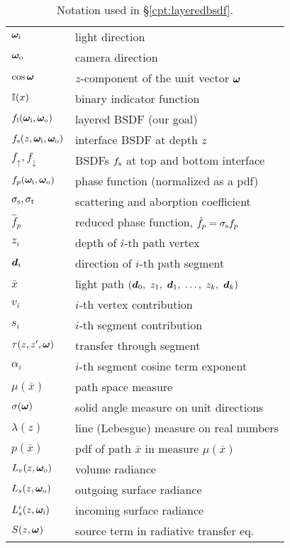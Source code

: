\begin{table}[!ht]
	\centering
	\caption[Notation used in \S\ref{cpt:layeredbsdf}]{\label{tab:layeredbsdf:notation}
		Notation used in \S\ref{cpt:layeredbsdf}.
	}
	\renewcommand{\arraystretch}{1.1}
	\begin{tabular}{ll}
		$\bm\omega_\mathrm{i}$ & light direction \\
		$\bm\omega_\mathrm{o}$ & camera direction \\
		$\cos \bm\omega$ & $z$-component of the unit vector $\bm\omega$ \\
		$\mathbb{I}(x)$ & binary indicator function \\
		\hline
		
		$f_\mathrm{l}(\bm\omega_\mathrm{i}, \bm\omega_\mathrm{o})$ & layered BSDF (our goal) \\
		$f_\mathrm{s}(z, \bm\omega_\mathrm{i}, \bm\omega_\mathrm{o})$ & interface BSDF at depth $z$ \\
		$f_\uparrow, f_\downarrow$ & BSDFs $f_\mathrm{s}$ at top and bottom interface \\
		$f_p(\bm\omega_\mathrm{i}, \bm\omega_\mathrm{o})$ & phase function (normalized as a pdf) \\
		$\sigma_\mathrm{s}, \sigma_\mathrm{t}$ & scattering and aborption coefficient \\
		$\hat f_p$ & reduced phase function, $\hat f_p = \sigma_\mathrm{s} f_p$ \\
		\hline
		
		$z_i$ & depth of $i$-th path vertex \\
		$\bm{d}_i$ & direction of $i$-th path segment \\
		$\bar x$ & light path $(\bmd_0,\ z_1,\ \bmd_1,\ \dots,\ z_k,\ \bmd_k)$ \\
		$v_i$ & $i$-th vertex contribution \\
		$s_i$ & $i$-th segment contribution \\
		$\tau(z, z', \bm\omega)$ & transfer through segment \\
		$\alpha_i$ & $i$-th segment cosine term exponent \\
		$\mu(\bar x)$ & path space measure \\
		$\sigma(\bm\omega)$ & solid angle measure on unit directions \\
		$\lambda(z)$ & line (Lebesgue) measure on real numbers \\
		$p(\bar x)$ & pdf of path $\bar x$ in measure $\mu(\bar x)$ \\
		\hline
		
		$L_v(z, \bm\omega_\mathrm{o})$ & volume radiance \\
		$L_s(z, \bm\omega_\mathrm{o})$ & outgoing surface radiance \\
		$L^i_s(z, \bm\omega_\mathrm{i})$ & incoming surface radiance \\
		$S(z, \bm\omega)$ & source term in radiative transfer eq. \\
	\end{tabular}
\end{table}
